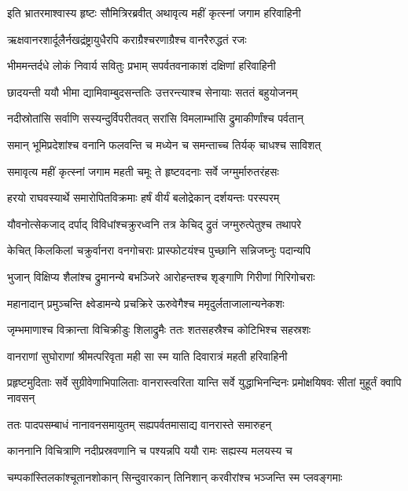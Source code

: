 \twolineshloka
{इति भ्रातरमाश्वास्य हृष्टः सौमित्रिरब्रवीत्}
{अथावृत्य महीं कृत्स्नां जगाम हरिवाहिनी} %

\twolineshloka
{ऋक्षवानरशार्दूलैर्नखद्रंष्ट्रायुधैरपि}
{कराग्रैश्चरणाग्रैश्च वानरैरुद्धतं रजः} %

\twolineshloka
{भीममन्तर्दधे लोकं निवार्य सवितुः प्रभाम्}
{सपर्वतवनाकाशं दक्षिणां हरिवाहिनी} %

\twolineshloka
{छादयन्ती ययौ भीमा द्यामिवाम्बुदसन्ततिः}
{उत्तरन्त्याश्च सेनायाः सततं बहुयोजनम्} %

\twolineshloka
{नदीस्रोतांसि सर्वाणि सस्यन्दुर्विपरीतवत्}
{सरांसि विमलाम्भांसि द्रुमाकीर्णांश्च पर्वतान्} %

\twolineshloka
{समान् भूमिप्रदेशांश्च वनानि फलवन्ति च}
{मध्येन च समन्ताच्च तिर्यक् चाधश्च साविशत्} %

\twolineshloka
{समावृत्य महीं कृत्स्नां जगाम महती चमूः}
{ते हृष्टवदनाः सर्वे जग्मुर्मारुतरंहसः} %

\twolineshloka
{हरयो राघवस्यार्थे समारोपितविक्रमाः}
{हर्षं वीर्यं बलोद्रेकान् दर्शयन्तः परस्परम्} %

\twolineshloka
{यौवनोत्सेकजाद् दर्पाद् विविधांश्चक्रुरध्वनि}
{तत्र केचिद् द्रुतं जग्मुरुत्पेतुश्च तथापरे} %

\twolineshloka
{केचित् किलकिलां चक्रुर्वानरा वनगोचराः}
{प्रास्फोटयंश्च पुच्छानि सन्निजघ्नुः पदान्यपि} %

\twolineshloka
{भुजान् विक्षिप्य शैलांश्च द्रुमानन्ये बभञ्जिरे}
{आरोहन्तश्च शृङ्गाणि गिरीणां गिरिगोचराः} %

\twolineshloka
{महानादान् प्रमुञ्चन्ति क्ष्वेडामन्ये प्रचक्रिरे}
{ऊरुवेगैश्च ममृदुर्लताजालान्यनेकशः} %

\twolineshloka
{जृम्भमाणाश्च विक्रान्ता विचिक्रीडुः शिलाद्रुमैः}
{ततः शतसहस्रैश्च कोटिभिश्च सहस्रशः} %

\twolineshloka
{वानराणां सुघोराणां श्रीमत्परिवृता मही}
{सा स्म याति दिवारात्रं महती हरिवाहिनी} %

\threelineshloka
{प्रहृष्टमुदिताः सर्वे सुग्रीवेणाभिपालिताः}
{वानरास्त्वरिता यान्ति सर्वे युद्धाभिनन्दिनः}
{प्रमोक्षयिषवः सीतां मुहूर्तं क्वापि नावसन्} %

\twolineshloka
{ततः पादपसम्बाधं नानावनसमायुतम्}
{सह्यपर्वतमासाद्य वानरास्ते समारुहन्} %

\twolineshloka
{काननानि विचित्राणि नदीप्रस्रवणानि च}
{पश्यन्नपि ययौ रामः सह्यस्य मलयस्य च} %

\twolineshloka
{चम्पकांस्तिलकांश्चूतानशोकान् सिन्दुवारकान्}
{तिनिशान् करवीरांश्च भञ्जन्ति स्म प्लवङ्गमाः} %

